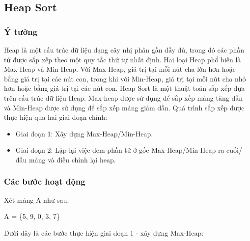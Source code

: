 \subsection{Heap Sort}

\subsubsection{Ý tưởng}
Heap là một cấu trúc dữ liệu dạng cây nhị phân gần đầy đủ, trong đó các phần tử được sắp xếp theo một quy tắc thứ tự nhất định. Hai loại Heap phổ biến là Max-Heap và Min-Heap. Với Max-Heap, giá trị tại mỗi nút cha lớn hơn hoặc bằng giá trị tại các nút con, trong khi với Min-Heap, giá trị tại mỗi nút cha nhỏ hơn hoặc bằng giá trị tại các nút con.
Heap Sort là một thuật toán sắp xếp dựa trên cấu trúc dữ liệu Heap. Max-heap được sử dụng để sắp xếp mảng tăng dần và Min-Heap được sử dụng để sắp xếp mảng giảm dần. Quá trình sắp xếp được thực hiện qua hai giai đoạn chính: 
\begin{itemize}
    \item Giai đoạn 1: Xây dựng Max-Heap/Min-Heap.
    \item Giai đoạn 2: Lặp lại việc đem phần tử ở gốc Max-Heap/Min-Heap ra cuối/đầu mảng và điều chỉnh lại heap.
\end{itemize}

\subsubsection{Các bước hoạt động}
Xét mảng A như sau: 
\begin{center}
   A = \{5, 9, 0, 3, 7\} 
\end{center} 
Dưới đây là các bước thực hiện giai đoạn 1 - xây dựng Max-Heap:

\begin{table}[H]
\centering
{}
\caption{Các bước xây dựng Max-Heap}
\end{table}


